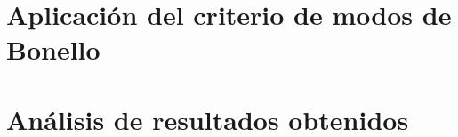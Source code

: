 \section{Aplicación del criterio de modos de Bonello}
\resetallcounters

\clearpage





\section{Análisis de resultados obtenidos}
\resetallcounters

\clearpage





